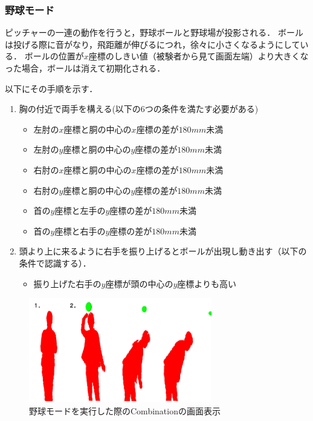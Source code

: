 \subsubsection{野球モード}
ピッチャーの一連の動作を行うと，野球ボールと野球場が投影される．
ボールは投げる際に音がなり，飛距離が伸びるにつれ，徐々に小さくなるようにしている．
ボールの位置が$x$座標のしきい値（被験者から見て画面左端）より大きくなった場合，ボールは消えて初期化される．

以下にその手順を示す．

\begin{enumerate}
    \item 胸の付近で両手を構える(以下の6つの条件を満たす必要がある)
        \begin{itemize}
            \item 左肘の$x$座標と胴の中心の$x$座標の差が$180mm$未満
            \item 左肘の$y$座標と胴の中心の$y$座標の差が$180mm$未満
            \item 右肘の$x$座標と胴の中心の$x$座標の差が$180mm$未満
            \item 右肘の$y$座標と胴の中心の$y$座標の差が$180mm$未満
            \item 首の$y$座標と左手の$y$座標の差が$180mm$未満
            \item 首の$y$座標と右手の$y$座標の差が$180mm$未満
        \end{itemize}
    \item 頭より上に来るように右手を振り上げるとボールが出現し動き出す（以下の条件で認識する）．
        \begin{itemize}
            \item 振り上げた右手の$y$座標が頭の中心の$y$座標よりも高い
        \end{itemize}
\end{enumerate}

\clearpage

\begin{figure}[t]
    \centering
    \includegraphics[width=8cm]{image/baseball.png}
    \caption{野球モードを実行した際のCombinationの画面表示}
  \label{baseball}
\end{figure}


